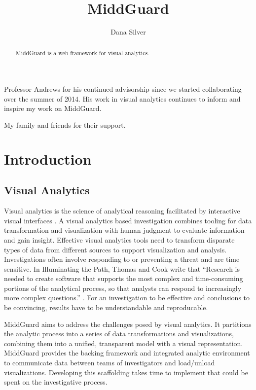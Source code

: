 \documentclass[midd]{thesis}
\title {MiddGuard}
\author {Dana Silver}
\begin{document}
\maketitle

\begin{abstract}

MiddGuard is a web framework for visual analytics.

\end{abstract}

\begin{acknowledgements}

Professor Andrews for his continued advisorship since we started collaborating
over the summer of 2014. His work in visual analytics continues to inform and
inspire my work on MiddGuard.

My family and friends for their support.

\end{acknowledgements}

\contentspage
\figurelistpage

\normalspacing \setcounter{page}{1} 

\chapter{Introduction}

\section{Visual Analytics}

Visual analytics is the science of analytical reasoning facilitated by
interactive visual interfaces \cite{illuminate}. A visual analytics based
investigation combines tooling for data transformation and visualization with
human judgment to evaluate information and gain insight. Effective visual
analytics tools need to transform disparate types of data from different sources
to support visualization and analysis. Investigations often involve responding
to or preventing a threat and are time sensitive. In Illuminating the Path,
Thomas and Cook write that ``Research is needed to create software that supports
the most complex and time-consuming portions of the analytical process, so that
analysts can respond to increasingly more complex questions.''
\cite{illuminate}. For an investigation to be effective and conclusions to be
convincing, results have to be understandable and reproducable.

MiddGuard aims to address the challenges posed by visual analytics. It
partitions the analytic process into a series of data transformations and
visualizations, combining them into a unified, transparent model with a visual
representation. MiddGuard provides the backing framework and integrated analytic
environment to communicate data between teams of investigators and load/unload
visualizations. Developing this scaffolding takes time to implement that could
be spent on the investigative process.
\end{document}

